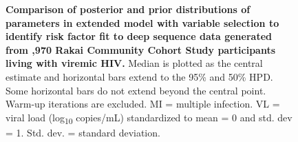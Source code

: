 \documentclass[10pt,letterpaper]{article}
\begin{document}
\begin{figure}[!ht]
\caption{{\bf Comparison of posterior and prior distributions of parameters in extended model with variable selection to identify risk factor fit to deep sequence data generated from ,970 Rakai Community Cohort Study participants living with viremic HIV.} Median is plotted as the central estimate and horizontal bars extend to the 95\% and 50\% HPD. Some horizontal bars do not extend beyond the central point. Warm-up iterations are excluded. MI = multiple infection. VL = viral load (log\textsubscript{10} copies/mL) standardized to mean = 0 and std. dev = 1. Std. dev. = standard deviation. }
\end{figure}
\end{document}
